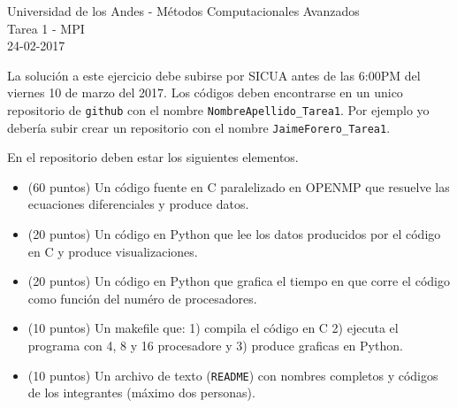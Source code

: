 \documentclass[11pt,letterpaper]{exam}
\begin{document}
\begin{center}
{\Large Universidad de los Andes - M\'etodos Computacionales Avanzados} \\
Tarea 1 - \textsc{MPI}\\
24-02-2017\\
\end{center}

\vspace{0.3cm}


\noindent
La solución a este ejercicio debe subirse por SICUA antes de las 6:00PM
del viernes 10 de marzo del 2017. 
Los c\'odigos deben encontrarse en un unico repositorio de \verb'github'
con el nombre \verb"NombreApellido_Tarea1". Por ejemplo yo deber\'ia
subir crear un repositorio con el nombre \verb"JaimeForero_Tarea1". 

\noindent
En el repositorio deben estar los siguientes elementos.
\begin{itemize}
\item (60 puntos) Un c\'odigo fuente en C paralelizado en OPENMP que resuelve las ecuaciones diferenciales y produce datos.
\item (20 puntos) Un c\'odigo en Python que lee los datos producidos por el
  c\'odigo en C y produce visualizaciones.
\item (20 puntos) Un c\'odigo en Python que grafica el tiempo en que corre el c\'odigo como funci\'on del num\'ero de procesadores.
\item (10 puntos) Un makefile que: 1) compila el c\'odigo en C 2) ejecuta el programa con 4, 8 y 16 procesadore y 3) produce graficas en Python.
\item (10 puntos) Un archivo de texto (\verb"README") con nombres completos y c\'odigos de los integrantes (m\'aximo dos personas).
\end{itemize}

\vspace{0.3cm}
\end{document}
